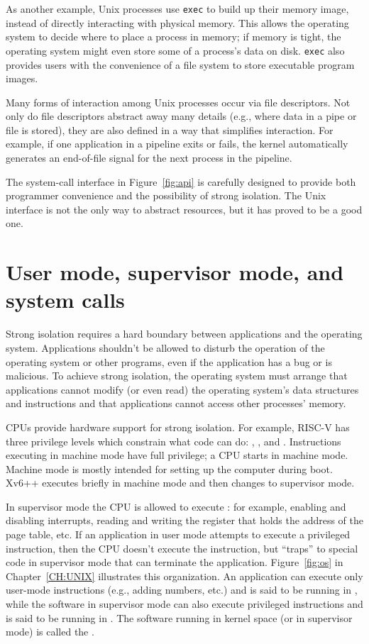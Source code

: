 As another example, Unix processes use
\lstinline{exec}
to build up their memory image, instead of directly interacting with physical
memory.  This allows the operating system to decide where to place a process in
memory; if memory is tight, the operating system might even store some of
a process's data on disk.
\lstinline{exec}
also provides
users with the convenience of a file system to store executable program images.

Many forms of interaction among Unix processes occur via file descriptors.
Not only do file descriptors abstract away many details (e.g.,
where data in a pipe or file is stored), they are also defined in a
way that simplifies interaction.
For example, if one application in a pipeline exits or fails, the kernel
automatically generates an end-of-file signal for the next process in the pipeline.

The system-call interface in
Figure~\ref{fig:api}
is carefully designed to provide both programmer convenience and
the possibility of strong isolation.  The Unix interface
is not the only way to abstract resources, but it has proved to be a good
one.

\section{User mode, supervisor mode, and system calls}

Strong isolation requires a hard boundary between applications and the operating
system.
Applications shouldn't be allowed to disturb the operation of
the operating system or other programs, even if the application
has a bug or is malicious.
To achieve strong isolation, the operating system must arrange that applications cannot modify (or even
read) the operating system's data structures and instructions and that
applications cannot access other processes' memory.

CPUs provide hardware support for strong isolation.   For
example, RISC-V has three privilege levels which constrain
what code can do:
,
, and
.
Instructions executing in machine mode have full privilege; a
CPU starts in machine mode.  Machine mode is mostly intended for
setting up the computer during boot.  Xv6++ executes briefly in machine mode and
then changes to supervisor mode.

In supervisor mode the CPU is allowed to execute
:
for example, enabling and disabling interrupts,  reading and writing
the register that holds the address of the page table, etc.
If an application in user mode attempts to execute
a privileged instruction, then the CPU doesn't execute the instruction, but
``traps''
to special code in supervisor mode that can terminate the application.
Figure~\ref{fig:os}
in Chapter~\ref{CH:UNIX} illustrates this organization.  An application can
execute only user-mode instructions (e.g., adding numbers, etc.) and is said to
be running in
,
while the software in supervisor mode can also execute privileged instructions and
is said to be running in
.
The software running in kernel space (or in supervisor mode) is called
the
.

